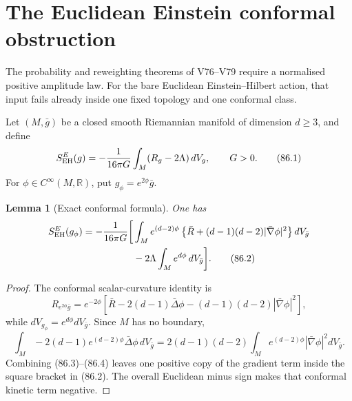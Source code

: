 \documentclass[11pt]{article}
\newtheorem{lemma}[theorem]{Lemma}
\begin{document}

\section{The Euclidean Einstein conformal obstruction}
\label{sec:v11v86}

The probability and reweighting theorems of V76--V79 require a
normalised positive amplitude law.  For the bare Euclidean
Einstein--Hilbert action, that input fails already inside one fixed
topology and one conformal class.

Let \((M,\bar g)\) be a closed smooth Riemannian manifold of dimension
\(d\ge3\), and define
\[
 S_{\rm EH}^{E}(g)
 =-{1\over16\pi G}\int_M(R_g-2\Lambda)\,dV_g,
                    \qquad G>0.                             \tag{86.1}
\]
For \(\phi\in C^\infty(M,\mathbb R)\), put
\(g_\phi=e^{2\phi}\bar g\).

\begin{lemma}[Exact conformal formula]
\label{lem:v11v86-conformal}
One has
\[
 \begin{split}
 S_{\rm EH}^{E}(g_\phi)
 =-{1\over16\pi G}\bigg[
 &\int_Me^{(d-2)\phi}
   \left\{\bar R+(d-1)(d-2)|\bar\nabla\phi|^2\right\}
                         dV_{\bar g}\\
 &-2\Lambda\int_Me^{d\phi}\,dV_{\bar g}\bigg].               \tag{86.2}
 \end{split}
\]
\end{lemma}

\begin{proof}
The conformal scalar-curvature identity is
\[
 R_{e^{2\phi}\bar g}
 =e^{-2\phi}\left[
 \bar R-2(d-1)\bar\Delta\phi
 -(d-1)(d-2)|\bar\nabla\phi|^2\right],                       \tag{86.3}
\]
while \(dV_{g_\phi}=e^{d\phi}dV_{\bar g}\).  Since \(M\) has no
boundary,
\[
 \int_M-2(d-1)e^{(d-2)\phi}\bar\Delta\phi\,dV_{\bar g}
 =2(d-1)(d-2)\int_Me^{(d-2)\phi}
                    |\bar\nabla\phi|^2dV_{\bar g}.           \tag{86.4}
\]
Combining (86.3)--(86.4) leaves one positive copy of the gradient
term inside the square bracket in (86.2).  The overall Euclidean
minus sign makes that conformal kinetic term negative.
\end{proof}
\end{document}
